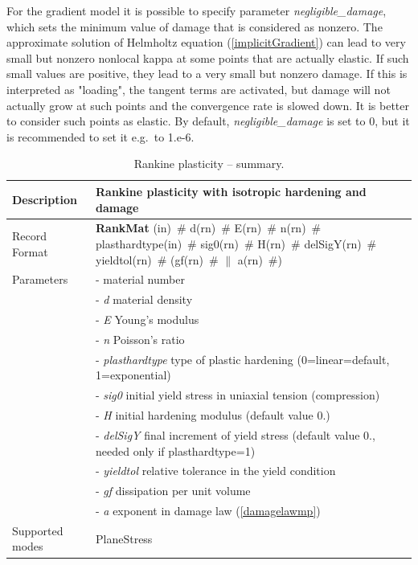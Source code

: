 \documentclass[a4paper]{article}
\newcommand{\descitem}[1]{{\noindent \bf #1}}
\newcommand{\elemparam}[2]{{{#1\tiny (#2)}~\#}}
\newcommand{\param}[1]{{\it #1}}
\begin{document}
For the gradient model
it is possible to specify parameter \param{negligible\_damage}, which sets the minimum
value of damage that is considered as nonzero. 
The approximate solution of Helmholtz equation (\ref{implicitGradient}) can lead
    to very small but nonzero nonlocal kappa at some points that
    are actually elastic. If such small values are positive,
    they lead to a very small but nonzero damage. If this is
    interpreted as "loading", the tangent terms are activated,
    but damage will not actually grow at such points and the
    convergence rate is slowed down. It is better to consider
    such points as elastic. By default, \param{negligible\_damage} is set to 0,
but it is recommended to set it e.g.\ to 1.e-6.


\begin{table}[!htb]
\begin{tabular}{|l|p{9cm}|}
\hline
Description & Rankine plasticity with isotropic hardening and damage\\
\hline
Record Format & \descitem{RankMat}  \elemparam{}{in}
\elemparam{d}{rn} \elemparam{E}{rn} \elemparam{n}{rn} \elemparam{plasthardtype}{in} \elemparam{sig0}{rn} \elemparam{H}{rn} \elemparam{delSigY}{rn} \elemparam{yieldtol}{rn} (\elemparam{gf}{rn} $\|$ \elemparam{a}{rn}) \\
Parameters &- \param{} material number\\
&- \param{d} material density\\
&- \param{E} Young's modulus\\
&- \param{n} Poisson's ratio\\
&- \param{plasthardtype} type of plastic hardening (0=linear=default, 1=exponential)\\
&- \param{sig0} initial yield stress in uniaxial tension (compression)\\
&- \param{H} initial hardening modulus (default value 0.)\\
&- \param{delSigY} final increment of yield stress (default value 0., needed only if plasthardtype=1)\\
&- \param{yieldtol} relative tolerance in the yield condition\\
&- \param{gf} dissipation per unit volume\\
&- \param{a} exponent in damage law (\ref{damagelawmp})\\
Supported modes& PlaneStress\\
\hline
\end{tabular}
\caption{Rankine plasticity -- summary.}
\label{rankineMat_table}
\end{table}
\end{document}
